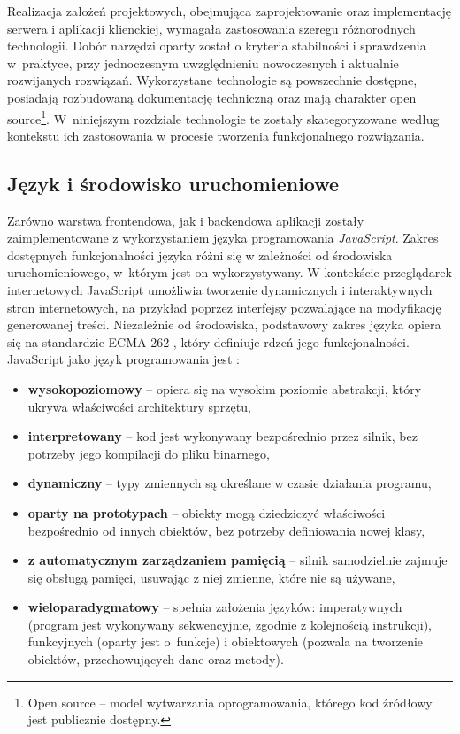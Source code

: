 Realizacja założeń projektowych, obejmująca zaprojektowanie oraz implementację serwera i aplikacji klienckiej, wymagała zastosowania szeregu różnorodnych technologii.
Dobór narzędzi oparty został o kryteria stabilności i sprawdzenia w~praktyce, przy jednoczesnym uwzględnieniu nowoczesnych i aktualnie rozwijanych rozwiązań.
Wykorzystane technologie są powszechnie dostępne, posiadają rozbudowaną dokumentację techniczną oraz mają charakter open source\footnote{Open source -- model wytwarzania oprogramowania, którego kod źródłowy jest publicznie dostępny.}.
W~niniejszym rozdziale technologie te zostały skategoryzowane według kontekstu ich zastosowania w procesie tworzenia funkcjonalnego rozwiązania.

\subsection{Język i środowisko uruchomieniowe}

Zarówno warstwa frontendowa, jak i backendowa aplikacji zostały zaimplementowane z wykorzystaniem języka programowania \emph{JavaScript}.
Zakres dostępnych funkcjonalności języka różni się w zależności od środowiska uruchomieniowego, w~którym jest on wykorzystywany.
W kontekście przeglądarek internetowych JavaScript umożliwia tworzenie dynamicznych i interaktywnych stron internetowych, na przykład poprzez interfejsy pozwalające na modyfikację generowanej treści.
Niezależnie od środowiska, podstawowy zakres języka opiera się na standardzie ECMA-262 \autocite{ecma262}, który definiuje rdzeń jego funkcjonalności.
JavaScript jako język programowania jest \autocite{mdn_javascript}:
%
\begin{itemize}
    \item \textbf{wysokopoziomowy} -- opiera się na wysokim poziomie abstrakcji, który ukrywa właściwości architektury sprzętu,
    \item \textbf{interpretowany} -- kod jest wykonywany bezpośrednio przez silnik, bez potrzeby jego kompilacji do pliku binarnego,
    \item \textbf{dynamiczny} -- typy zmiennych są określane w czasie działania programu,
    \item \textbf{oparty na prototypach} -- obiekty mogą dziedziczyć właściwości bezpośrednio od innych obiektów, bez potrzeby definiowania nowej klasy,
    \item \textbf{z automatycznym zarządzaniem pamięcią} -- silnik samodzielnie zajmuje się obsługą pamięci, usuwając z niej zmienne, które nie są używane,
    \item \textbf{wieloparadygmatowy} -- spełnia założenia języków: imperatywnych (program jest wykonywany sekwencyjnie, zgodnie z kolejnością instrukcji), funkcyjnych (oparty jest o~funkcje) i obiektowych (pozwala na tworzenie obiektów, przechowujących dane oraz metody).
\end{itemize}

